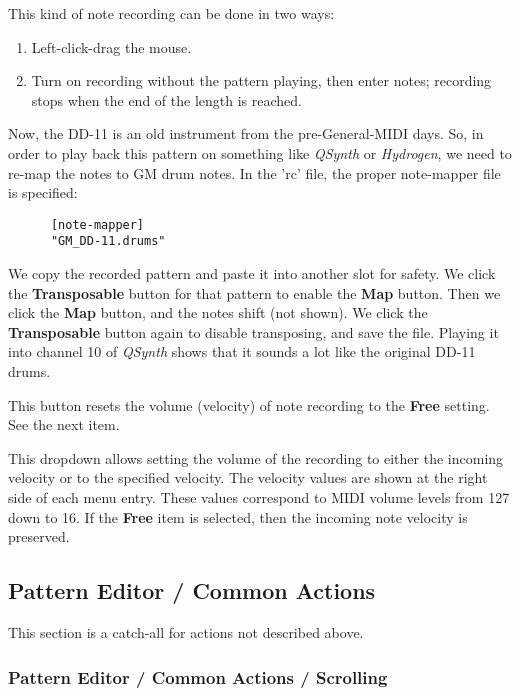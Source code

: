    This kind of note recording can be done in two ways:

   \begin{enumerate}
      \item Left-click-drag the mouse.
      \item Turn on recording without the pattern playing, then
         enter notes; recording stops when the end of the length is reached.
   \end{enumerate}

   Now, the DD-11 is an old instrument from the pre-General-MIDI days.
   So, in order to play back this pattern on something like
   \textsl{QSynth} or \textsl{Hydrogen}, we need to re-map the notes to GM drum
   notes.  In the 'rc' file, the proper note-mapper file is specified:

   \begin{verbatim}
      [note-mapper]
      "GM_DD-11.drums"
   \end{verbatim}

   We copy the recorded pattern and paste it into another slot for safety.
   We click the \textbf{Transposable} button for that pattern to enable the
   \textbf{Map} button.  Then we click the \textbf{Map} button, and the notes
   shift (not shown).  
   We click the \textbf{Transposable} button again to disable transposing,
   and save the file.
   Playing it into channel 10 of \textsl{QSynth} shows that it sounds a lot
   like the original DD-11 drums.

   This button resets the volume (velocity)
   of note recording to the \textbf{Free} setting.
   See the next item.

   This dropdown allows setting the volume of the recording to either the
   incoming velocity or to the specified velocity.
   The velocity values are shown at the right side of each menu entry.
   These values correspond to MIDI volume levels from 127 down to 16.
   If the \textbf{Free} item is selected, then the incoming note velocity is
   preserved.

\subsection{Pattern Editor / Common Actions}
\label{subsec:pattern_editor_common}

   This section is a catch-all for actions not described above.

\subsubsection{Pattern Editor / Common Actions / Scrolling}
\label{subsec:pattern_editor_scrolling}

